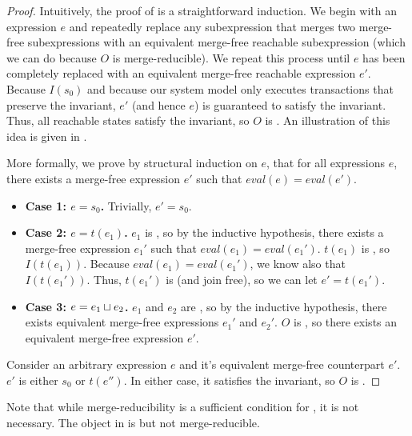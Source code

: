 \begin{proof}
  Intuitively, the proof of  is a
  straightforward induction. We begin with an \sTIreachable{} expression $e$
  and repeatedly replace any subexpression that merges two merge-free
  subexpressions with an equivalent merge-free reachable subexpression (which
  we can do because $O$ is merge-reducible). We repeat this process until $e$
  has been completely replaced with an equivalent merge-free reachable
  expression $e'$. Because $I(s_0)$ and because our system model only executes
  transactions that preserve the invariant, $e'$ (and hence $e$) is guaranteed
  to satisfy the invariant. Thus, all reachable states satisfy the invariant,
  so $O$ is \invariantconfluent{}. An illustration of this idea is given in
  .

  More formally, we prove by structural induction on $e$, that for all
  \sTIreachable{} expressions $e$, there exists a merge-free \sTIreachable{}
  expression $e'$ such that $eval(e) = eval(e')$.
  \begin{itemize}
    \item \textbf{Case 1: $e = s_0$.}
      Trivially, $e' = s_0$.

    \item \textbf{Case 2: $e = t(e_1)$.}
      $e_1$ is \sTIreachable{}, so by the inductive hypothesis, there exists a
      merge-free \sTIreachable{} expression $e_1'$ such that $eval(e_1) =
      eval(e_1')$. $t(e_1)$ is \sTIreachable{}, so $I(t(e_1))$. Because
      $eval(e_1) = eval(e_1')$, we know also that $I(t(e_1'))$. Thus, $t(e_1')$
      is \sTIreachable{} (and join free), so we can let $e' = t(e_1')$.

    \item \textbf{Case 3: $e = e_1 \sqcup e_2$.}
      $e_1$ and $e_2$ are \sTIreachable{}, so by the inductive hypothesis,
      there exists equivalent merge-free \sTIreachable{} expressions $e_1'$ and
      $e_2'$. $O$ is \sTImergereducible{}, so there exists an equivalent
      merge-free \sTIreachable{} expression $e'$.
  \end{itemize}

  Consider an arbitrary \sTIreachable{} expression $e$ and it's equivalent
  merge-free \sTIreachable{} counterpart $e'$. $e'$ is either $s_0$ or
  $t(e'')$.  In either case, it satisfies the invariant, so $O$ is
  \sTIconfluent{}.
\end{proof}

Note that while merge-reducibility is a sufficient condition for
\invariantconfluence{}, it is not necessary. The object in
 is \invariantconfluent{} but not
merge-reducible.

